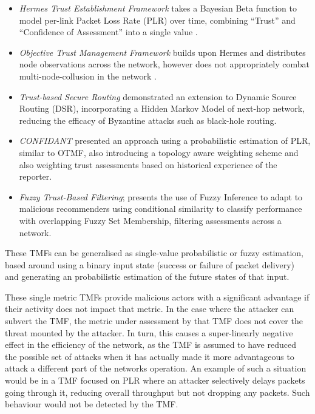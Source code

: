 \documentclass[conference]{IEEEtran}
\providecommand{\DIFaddbegin}{} %
\providecommand{\DIFaddend}{} %
\begin{document}
\begin{itemize}
  \item \emph{Hermes Trust Establishment Framework} takes a Bayesian Beta function to model per-link Packet Loss Rate (PLR) over time, combining ``Trust'' and ``Confidence of Assessment'' into a single value \cite{Zouridaki2005}.
  \item \emph{Objective Trust Management Framework} builds upon Hermes and distributes node observations across the network\cite{Li2008}, however does not appropriately combat multi-node-collusion in the network \cite{Cho2011}.
  \item \emph{Trust-based Secure Routing}\cite{Moe2008a} demonstrated an extension to Dynamic Source Routing (DSR), incorporating a Hidden Markov Model of next-hop network, reducing the efficacy of Byzantine attacks such as black-hole routing.
  \item \emph{CONFIDANT}\cite{Buchegger2002} presented an approach using a probabilistic estimation of PLR, similar to OTMF, also introducing a topology aware weighting scheme and also weighting trust assessments based on historical experience of the reporter.
  \item \emph{Fuzzy Trust-Based Filtering}; \cite{Luo2008} presents the use of Fuzzy Inference to adapt to malicious recommenders using conditional similarity to classify performance with overlapping Fuzzy Set Membership, filtering assessments across a network.
\end{itemize}

These TMFs can be generalised as single-value probabilistic or fuzzy estimation, based around using a binary input state (success or failure of packet delivery) and generating an probabilistic estimation of the future states of that input. 

\DIFaddbegin {}

\DIFaddend These single metric TMFs provide malicious actors with a significant advantage if their activity does not impact that metric.
In the case where the attacker can subvert the TMF, the metric under assessment by that TMF does not cover the threat mounted by the attacker.
In turn, this causes a super-linearly negative effect in the efficiency of the network, as the TMF is assumed to have reduced the possible set of attacks when it has actually made it more advantageous to attack a different part of the networks operation.
An example of such a situation would be in a TMF focused on PLR where an attacker selectively delays packets going through it, reducing overall throughput but not dropping any packets.
Such behaviour would not be detected by the TMF.
\end{document}
